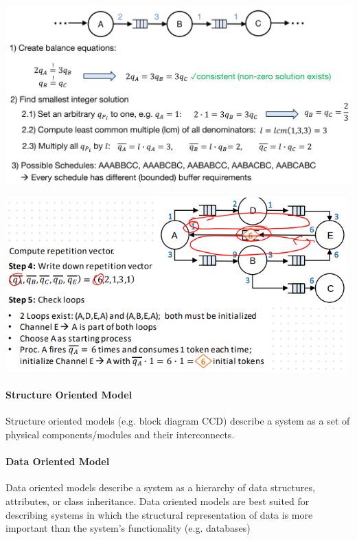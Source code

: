 \documentclass[english]{latex4ei/latex4ei_sheet}
\begin{document}
\begin{center}
  \includegraphics[width=\linewidth]{assets/SDFExample.png}
  \label{fig:sdfexample}
\end{center}


\begin{center}
  \includegraphics[width=\linewidth]{assets/SDFExample2.png}
  \label{fig:sdfexample2}
\end{center}

\paragraph{Structure Oriented Model} Structure oriented models (e.g. block diagram CCD) describe a system as a set of physical components/modules and their interconnects.

\paragraph{Data Oriented Model} Data oriented models describe a system as a hierarchy of data structures, attributes, or class inheritance. Data oriented models are best suited for describing systems in which the structural representation of data is more important than the system’s functionality (e.g. databases)
\end{document}
